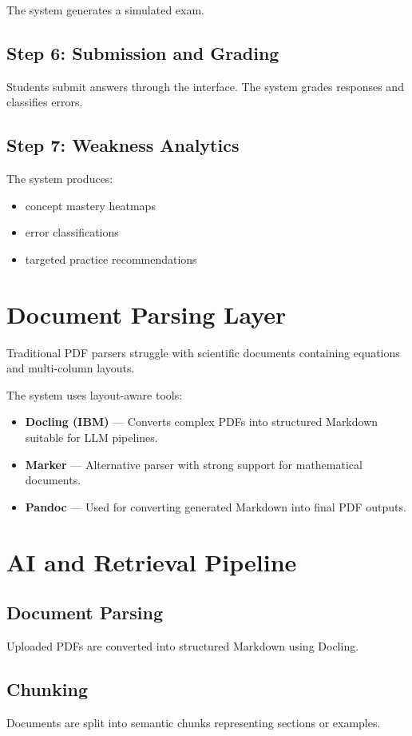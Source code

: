 \documentclass[11pt]{article}
\begin{document}
The system generates a simulated exam.

\subsection{Step 6: Submission and Grading}
Students submit answers through the interface. 
The system grades responses and classifies errors.

\subsection{Step 7: Weakness Analytics}
The system produces:
\begin{itemize}
\item concept mastery heatmaps
\item error classifications
\item targeted practice recommendations
\end{itemize}

\section{Document Parsing Layer}
Traditional PDF parsers struggle with scientific documents containing equations and multi-column layouts.

The system uses layout-aware tools:

\begin{itemize}
\item \textbf{Docling (IBM)} --- Converts complex PDFs into structured Markdown suitable for LLM pipelines.
\item \textbf{Marker} --- Alternative parser with strong support for mathematical documents.
\item \textbf{Pandoc} --- Used for converting generated Markdown into final PDF outputs.
\end{itemize}

\section{AI and Retrieval Pipeline}

\subsection{Document Parsing}
Uploaded PDFs are converted into structured Markdown using Docling.

\subsection{Chunking}
Documents are split into semantic chunks representing sections or examples.
\end{document}
